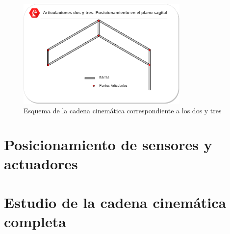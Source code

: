     \begin{figure}[H]
    \centering
    \includegraphics[width=0.75\textwidth]{figuras/mecanismos_4_barras.png}   
    \caption{Esquema de la cadena cinemática correspondiente a los  dos y tres}
    \label{fig:Mecanica:4_bar_mecanism}
    \end{figure}

\section{Posicionamiento de sensores y actuadores} \label{sec:Mecanica:sensores_actuadore}

\section{Estudio de la cadena cinemática completa} \label{sec:Mecanica:cadena_cinematica}
